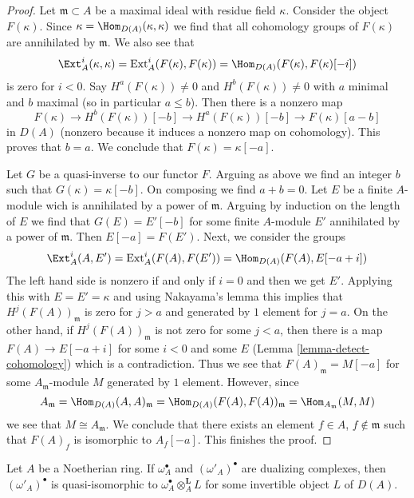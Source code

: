 \begin{proof}
Let $\mathfrak m \subset A$ be a maximal ideal with residue field $\kappa$.
Consider the object $F(\kappa)$. Since
$\kappa = \Hom_{D(A)}(\kappa, \kappa)$ we find that all
cohomology groups of $F(\kappa)$ are annihilated by $\mathfrak m$.
We also see that
$$
\Ext^i_A(\kappa, \kappa) = \text{Ext}^i_A(F(\kappa), F(\kappa))
= \Hom_{D(A)}(F(\kappa), F(\kappa)[-i])
$$
is zero for $i < 0$. Say $H^a(F(\kappa)) \not = 0$ and
$H^b(F(\kappa)) \not = 0$ with $a$ minimal and $b$ maximal
(so in particular $a \leq b$). Then there is a nonzero map
$$
F(\kappa) \to H^b(F(\kappa))[-b] \to H^a(F(\kappa))[-b]
\to F(\kappa)[a - b]
$$
in $D(A)$ (nonzero because it induces a nonzero map on cohomology).
This proves that $b = a$. We conclude that $F(\kappa) = \kappa[-a]$.

\medskip\noindent
Let $G$ be a quasi-inverse to our functor $F$. Arguing as above
we find an integer $b$ such that $G(\kappa) = \kappa[-b]$.
On composing we find $a + b = 0$. Let $E$ be a finite $A$-module
wich is annihilated by a power of $\mathfrak m$. Arguing by
induction on the length of $E$ we find that $G(E) = E'[-b]$
for some finite $A$-module $E'$ annihilated by a power of
$\mathfrak m$. Then $E[-a] = F(E')$.
Next, we consider the groups
$$
\Ext^i_A(A, E') = \text{Ext}^i_A(F(A), F(E')) =
\Hom_{D(A)}(F(A), E[-a + i])
$$
The left hand side is nonzero if and only if $i = 0$ and then
we get $E'$. Applying this with $E = E' = \kappa$ and using Nakayama's
lemma this implies that $H^j(F(A))_\mathfrak m$ is zero for $j > a$ and
generated by $1$ element for $j = a$. On the other hand, if
$H^j(F(A))_\mathfrak m$ is not zero for some $j < a$, then
there is a map $F(A) \to E[-a + i]$ for some $i < 0$ and some
$E$ (Lemma \ref{lemma-detect-cohomology}) which is a contradiction.
Thus we see that $F(A)_\mathfrak m = M[-a]$
for some $A_\mathfrak m$-module $M$ generated by $1$ element.
However, since
$$
A_\mathfrak m = \Hom_{D(A)}(A, A)_\mathfrak m =
\Hom_{D(A)}(F(A), F(A))_\mathfrak m = \Hom_{A_\mathfrak m}(M, M)
$$
we see that $M \cong A_\mathfrak m$. We conclude that there exists
an element $f \in A$, $f \not \in \mathfrak m$ such that
$F(A)_f$ is isomorphic to $A_f[-a]$. This finishes the proof.
\end{proof}

\begin{lemma}
\label{lemma-dualizing-unique}
Let $A$ be a Noetherian ring. If $\omega_A^\bullet$ and
$(\omega'_A)^\bullet$ are dualizing complexes, then
$(\omega'_A)^\bullet$ is quasi-isomorphic to
$\omega_A^\bullet \otimes_A^\mathbf{L} L$
for some invertible object $L$ of $D(A)$.
\end{lemma}

